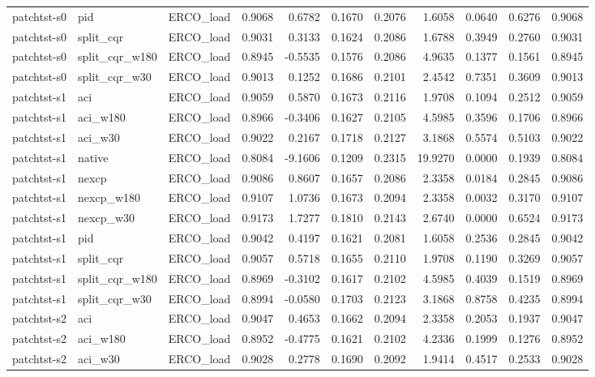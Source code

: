 \begin{tabular}{lllrrrrrrrr}
patchtst-s0 & pid & ERCO_load & 0.9068 & 0.6782 & 0.1670 & 0.2076 & 1.6058 & 0.0640 & 0.6276 & 0.9068 \\
patchtst-s0 & split_cqr & ERCO_load & 0.9031 & 0.3133 & 0.1624 & 0.2086 & 1.6788 & 0.3949 & 0.2760 & 0.9031 \\
patchtst-s0 & split_cqr_w180 & ERCO_load & 0.8945 & -0.5535 & 0.1576 & 0.2086 & 4.9635 & 0.1377 & 0.1561 & 0.8945 \\
patchtst-s0 & split_cqr_w30 & ERCO_load & 0.9013 & 0.1252 & 0.1686 & 0.2101 & 2.4542 & 0.7351 & 0.3609 & 0.9013 \\
patchtst-s1 & aci & ERCO_load & 0.9059 & 0.5870 & 0.1673 & 0.2116 & 1.9708 & 0.1094 & 0.2512 & 0.9059 \\
patchtst-s1 & aci_w180 & ERCO_load & 0.8966 & -0.3406 & 0.1627 & 0.2105 & 4.5985 & 0.3596 & 0.1706 & 0.8966 \\
patchtst-s1 & aci_w30 & ERCO_load & 0.9022 & 0.2167 & 0.1718 & 0.2127 & 3.1868 & 0.5574 & 0.5103 & 0.9022 \\
patchtst-s1 & native & ERCO_load & 0.8084 & -9.1606 & 0.1209 & 0.2315 & 19.9270 & 0.0000 & 0.1939 & 0.8084 \\
patchtst-s1 & nexcp & ERCO_load & 0.9086 & 0.8607 & 0.1657 & 0.2086 & 2.3358 & 0.0184 & 0.2845 & 0.9086 \\
patchtst-s1 & nexcp_w180 & ERCO_load & 0.9107 & 1.0736 & 0.1673 & 0.2094 & 2.3358 & 0.0032 & 0.3170 & 0.9107 \\
patchtst-s1 & nexcp_w30 & ERCO_load & 0.9173 & 1.7277 & 0.1810 & 0.2143 & 2.6740 & 0.0000 & 0.6524 & 0.9173 \\
patchtst-s1 & pid & ERCO_load & 0.9042 & 0.4197 & 0.1621 & 0.2081 & 1.6058 & 0.2536 & 0.2845 & 0.9042 \\
patchtst-s1 & split_cqr & ERCO_load & 0.9057 & 0.5718 & 0.1655 & 0.2110 & 1.9708 & 0.1190 & 0.3269 & 0.9057 \\
patchtst-s1 & split_cqr_w180 & ERCO_load & 0.8969 & -0.3102 & 0.1617 & 0.2102 & 4.5985 & 0.4039 & 0.1519 & 0.8969 \\
patchtst-s1 & split_cqr_w30 & ERCO_load & 0.8994 & -0.0580 & 0.1703 & 0.2123 & 3.1868 & 0.8758 & 0.4235 & 0.8994 \\
patchtst-s2 & aci & ERCO_load & 0.9047 & 0.4653 & 0.1662 & 0.2094 & 2.3358 & 0.2053 & 0.1937 & 0.9047 \\
patchtst-s2 & aci_w180 & ERCO_load & 0.8952 & -0.4775 & 0.1621 & 0.2102 & 4.2336 & 0.1999 & 0.1276 & 0.8952 \\
patchtst-s2 & aci_w30 & ERCO_load & 0.9028 & 0.2778 & 0.1690 & 0.2092 & 1.9414 & 0.4517 & 0.2533 & 0.9028 \\

\end{tabular}
